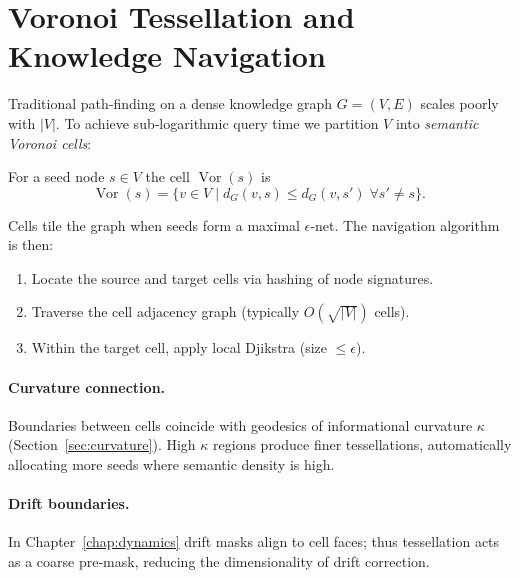 
\section{Voronoi Tessellation and Knowledge Navigation}\label{sec:tessellation}

Traditional path‑finding on a dense knowledge graph $G=(V,E)$ scales poorly with $|V|$.
To achieve sub‑logarithmic query time we partition $V$ into \emph{semantic Voronoi cells}:
\begin{definition}
For a seed node $s\in V$ the cell $\operatorname{Vor}(s)$ is
\[
  \operatorname{Vor}(s)=\{v\in V\mid d_G(v,s)\le d_G(v,s')\;\forall s'\neq s\}.\,
\]
\end{definition}
Cells tile the graph when seeds form a maximal $\epsilon$‑net.  The navigation algorithm is then:
\begin{enumerate}
  \item Locate the source and target cells via hashing of node signatures.
  \item Traverse the cell adjacency graph (typically \(O(\sqrt{|V|})\) cells).
  \item Within the target cell, apply local Djikstra (size $\le\epsilon$).
\end{enumerate}

\paragraph{Curvature connection.}  Boundaries between cells coincide with geodesics of
informational curvature $\kappa$ (Section~\ref{sec:curvature}).  High $\kappa$ regions
produce finer tessellations, automatically allocating more seeds where semantic density is high.

\paragraph{Drift boundaries.}  In Chapter~\ref{chap:dynamics} drift masks align to cell
faces; thus tessellation acts as a coarse pre‑mask, reducing the dimensionality of drift
correction.

